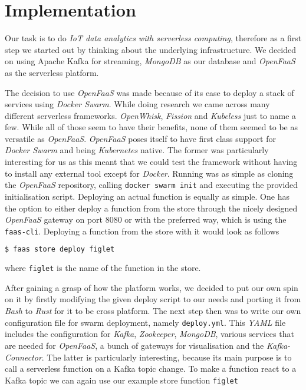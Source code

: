 \section{Implementation}

Our task is to do \textit{IoT data analytics with serverless computing}, therefore as a first step
we started out by thinking about the underlying infrastructure. We decided on using Apache Kafka for
streaming, \textit{MongoDB} as our database and \textit{OpenFaaS} as the serverless platform.

The decision to use \textit{OpenFaaS} was made because of its ease to deploy a stack of services
using \textit{Docker Swarm}. While doing research we came across many different serverless
frameworks. \textit{OpenWhisk}, \textit{Fission} and \textit{Kubeless} just to name a few. While all
of those seem to have their benefits, none of them seemed to be as versatile as \textit{OpenFaaS}.
\textit{OpenFaaS} poses itself to have first class support for \textit{Docker Swarm} and being
\textit{Kubernetes} native. The former was particularly interesting for us as this meant that we
could test the framework without having to install any external tool except for  \textit{Docker}.
Running was as simple as cloning the \textit{OpenFaaS} repository, calling \texttt{docker swarm
init} and executing the provided initialisation script. Deploying an actual function is equally as
simple. One has the option to either deploy a function from the store through the nicely designed
\textit{OpenFaaS} gateway on port 8080 or with the preferred way, which is using the
\texttt{faas-cli}. Deploying a function from the store with it would look as follows

\begin{lstlisting}[language=bash]
$ faas store deploy figlet
\end{lstlisting}

where \texttt{figlet} is the name of the function in the store.

After gaining a grasp of how the platform works, we decided to put our own spin on it by firstly
modifying the given deploy script to our needs and porting it from \textit{Bash} to \textit{Rust}
for it to be cross platform. The next step then was to write our own configuration file for swarm
deployment, namely \texttt{deploy.yml}. This \textit{YAML} file includes the configuration for
\textit{Kafka}, \textit{Zookeeper}, \textit{MongoDB}, various services that are needed for
\textit{OpenFaaS}, a bunch of gateways for visualisation and the \textit{Kafka-Connector}. The
latter is particularly interesting, because its main purpose is to call a serverless function on a
Kafka topic change. To make a function react to a Kafka topic we can again use our example store
function \texttt{figlet}

